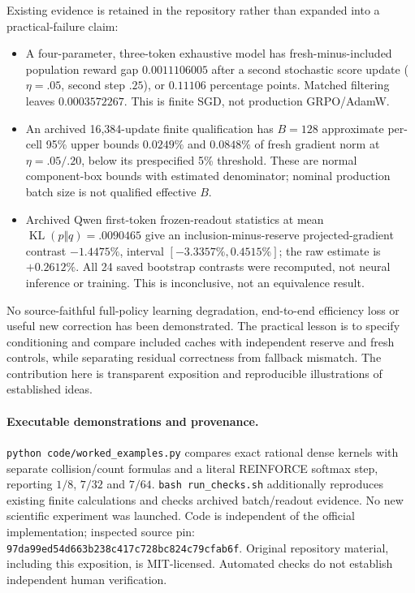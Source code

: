 \documentclass[10pt]{article}
\newcommand{\KL}{\operatorname{KL}}
\begin{document}
Existing evidence is retained in the repository rather than expanded into a practical-failure claim:
\begin{itemize}\setlength\itemsep{0pt}\setlength\parskip{0pt}
\item A four-parameter, three-token exhaustive model has fresh-minus-included population reward gap $0.0011106005$ after a second stochastic score update ($\eta=.05$, second step $.25$), or $0.11106$ percentage points. Matched filtering leaves $0.0003572267$. This is finite SGD, not production GRPO/AdamW.
\item An archived 16,384-update finite qualification has $B=128$ approximate per-cell 95\% upper bounds $0.0249\%$ and $0.0848\%$ of fresh gradient norm at $\eta=.05/.20$, below its prespecified 5\% threshold. These are normal component-box bounds with estimated denominator; nominal production batch size is not qualified effective $B$.
\item Archived Qwen first-token frozen-readout statistics at mean $\KL(p\Vert q)=.0090465$ give an inclusion-minus-reserve projected-gradient contrast $-1.4475\%$, interval $[-3.3357\%,0.4515\%]$; the raw estimate is $+0.2612\%$. All 24 saved bootstrap contrasts were recomputed, not neural inference or training. This is inconclusive, not an equivalence result.
\end{itemize}
No source-faithful full-policy learning degradation, end-to-end efficiency loss or useful new correction has been demonstrated. The practical lesson is to specify conditioning and compare included caches with independent reserve and fresh controls, while separating residual correctness from fallback mismatch. The contribution here is transparent exposition and reproducible illustrations of established ideas.

\paragraph{Executable demonstrations and provenance.}
\texttt{python code/worked\_examples.py} compares exact rational dense kernels with separate collision/count formulas and a literal REINFORCE softmax step, reporting $1/8$, $7/32$ and $7/64$. \texttt{bash run\_checks.sh} additionally reproduces existing finite calculations and checks archived batch/readout evidence. No new scientific experiment was launched. Code is independent of the official implementation; inspected source pin: \texttt{97da99ed54d663b238c417c728bc824c79cfab6f}. Original repository material, including this exposition, is MIT-licensed. Automated checks do not establish independent human verification.
\end{document}
